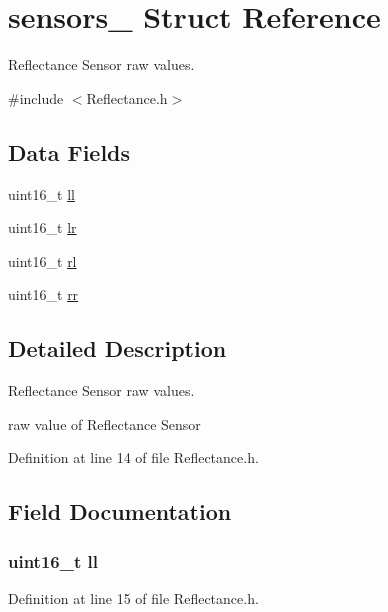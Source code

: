 \hypertarget{structsensors__}{}\section{sensors\+\_\+ Struct Reference}
\label{structsensors__}


Reflectance Sensor raw values.  




{\ttfamily \#include $<$Reflectance.\+h$>$}

\subsection*{Data Fields}
\begin{DoxyCompactItemize}
\item 
uint16\+\_\+t \hyperlink{structsensors___ae59d16ddcc59d6f6633ff99307ff7190}{ll}
\item 
uint16\+\_\+t \hyperlink{structsensors___af650f74b54fbe6d55c96161d2a7098ea}{lr}
\item 
uint16\+\_\+t \hyperlink{structsensors___a55f8b53aee5b41e8af88a816fab2b70b}{rl}
\item 
uint16\+\_\+t \hyperlink{structsensors___a6988d1a89f109b3f8d0e06547a5362f6}{rr}
\end{DoxyCompactItemize}


\subsection{Detailed Description}
Reflectance Sensor raw values. 

raw value of Reflectance Sensor 

Definition at line 14 of file Reflectance.\+h.



\subsection{Field Documentation}
\subsubsection[{\texorpdfstring{ll}{ll}}]{\setlength{\rightskip}{0pt plus 5cm}uint16\+\_\+t ll}\hypertarget{structsensors___ae59d16ddcc59d6f6633ff99307ff7190}{}\label{structsensors___ae59d16ddcc59d6f6633ff99307ff7190}


Definition at line 15 of file Reflectance.\+h.

